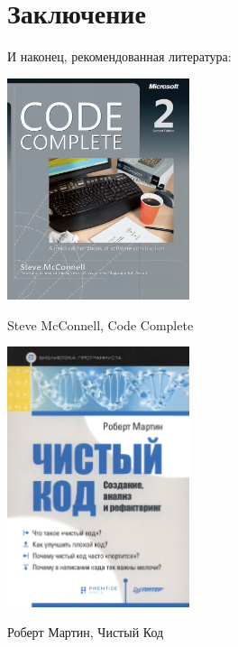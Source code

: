 \documentclass{../../text-style}
\begin{document}
\section{Заключение}

И наконец, рекомендованная литература:

\begin{multicols}{2}
    \begin{center}
        \includegraphics[width=0.4\textwidth]{codeCompleteCover.png}
    \end{center}

    Steve McConnell, Code Complete

    \columnbreak

    \begin{center}
        \includegraphics[width=0.4\textwidth]{cleanCodeCover.png}
    \end{center}

    Роберт Мартин, Чистый Код
\end{multicols}
\end{document}
